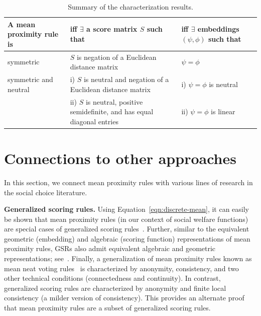 \documentclass[prodmode]{acmsmall-ec14}
\begin{document}
\begin{table}[ht]
\centering
\begin{tabular}{ | p{3.7cm} | p{5.8cm} | p{3cm} | }
\hline
\rule{0pt}{3ex}\textbf{A mean proximity rule is} & \textbf{iff $\boldsymbol{\exists}$ a score matrix $S$ such that} & \textbf{iff $\exists$ embeddings $(\psi,\phi)$ such that} \\[0.1cm] 
\hline 
\rule{0pt}{3ex}symmetric & $S$ is negation of a Euclidean distance matrix & $\psi = \phi$ \\[0.1cm]
\hline
\rule{0pt}{3ex}\multirow{2}{*} {symmetric and neutral} & i) $S$ is neutral and negation of a Euclidean distance matrix & i) $\psi = \phi$ is neutral\\
& ii) $S$ is neutral, positive semidefinite, and has equal diagonal entries & ii) $\psi = \phi$ is linear \\[0.1cm]
\hline
\end{tabular}
\captionsetup{width=\textwidth}
\caption{Summary of the characterization results.}
\label{tab:summary}
\end{table}



\section{Connections to other approaches}
\label{sec:connection}
In this section, we connect mean proximity rules with various lines of research in the social choice literature. 

\medskip 
\noindent \textbf{Generalized scoring rules.} Using Equation~\eqref{eqn:discrete-mean}, it can easily be shown that mean proximity rules (in our context of social welfare functions) are special cases of generalized scoring rules~\cite{XC08}. Further, similar to the equivalent geometric (embedding) and algebraic (scoring function) representations of mean proximity rules, GSRs also admit equivalent  algebraic and geometric representations; see~\cite{MPR12b}. Finally, a generalization of mean proximity rules known as mean neat voting rules~\cite{Zwicker08b} is characterized by anonymity, consistency, and two other technical conditions (connectedness and continuity). In contrast, generalized scoring rules are characterized by anonymity and finite local consistency (a milder version of consistency). This provides an alternate proof that mean proximity rules are a subset of generalized scoring rules. 
\end{document}
